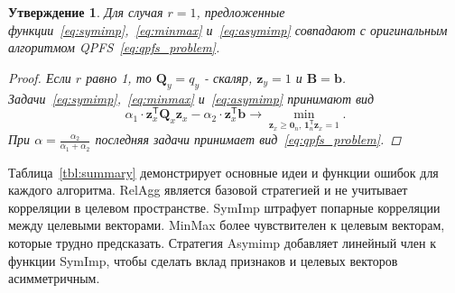 \documentclass[preprint,12pt]{elsarticle}
\newtheorem{proposition}{Утверждение}
\theoremstyle{definition}
\newcommand{\bz}{\mathbf{z}}
\newcommand{\bb}{\mathbf{b}}
\newcommand{\bB}{\mathbf{B}}
\newcommand{\bQ}{\mathbf{Q}}
\newcommand{\T}{\mathsf{T}}
\newcommand{\bOne}{\boldsymbol{1}}
\newcommand{\bZero}{\boldsymbol{0}}
\begin{document}
\begin{proposition}
    Для случая $r=1$, предложенные функции~\eqref{eq:symimp},~\eqref{eq:minmax} и~\eqref{eq:asymimp} совпадают с оригинальным алгоритмом QPFS~\eqref{eq:qpfs_problem}.
	
	\begin{proof}
    	Если $r$ равно 1, то $\bQ_y = q_y$ - скаляр, $\bz_y = 1$ и $\bB = \bb$. Задачи~\eqref{eq:symimp},~\eqref{eq:minmax} и~\eqref{eq:asymimp} принимают вид
		\begin{equation*}
		\alpha_1 \cdot \bz_x^{\T} \bQ_x \bz_x - \alpha_2 \cdot \bz_x^{\T} \bb \rightarrow \min_{\bz_x \geq \bZero_n, \, \bOne_n^{\T}\bz_x=1} .
		\end{equation*}
		При $\alpha = \frac{\alpha_2}{\alpha_1 + \alpha_2}$ последняя задачи принимает вид~\eqref{eq:qpfs_problem}.
	\end{proof}
\end{proposition}

Таблица~\ref{tbl:summary} демонстрирует основные идеи и функции ошибок для каждого алгоритма. 
RelAgg является базовой стратегией и не учитывает корреляции в целевом пространстве.
SymImp штрафует попарные корреляции между целевыми векторами.
MinMax более чувствителен к целевым векторам, которые трудно предсказать.
Стратегия Asymimp добавляет линейный член к функции SymImp, чтобы сделать вклад признаков и целевых векторов асимметричным.
\end{document}
